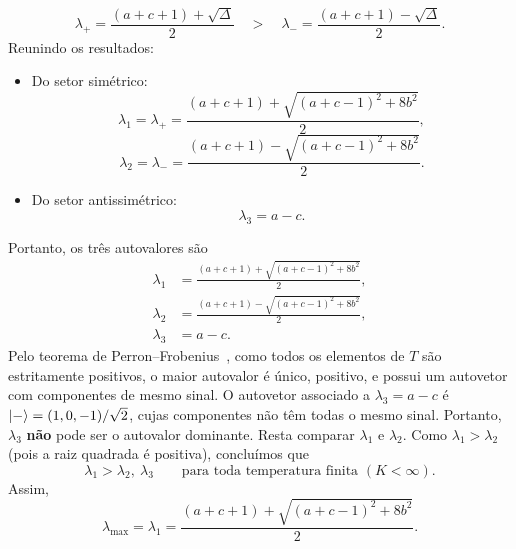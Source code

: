 \documentclass[11pt,a4paper]{article}
\begin{document}
%
\begin{equation}
    \lambda_+ = \frac{(a + c + 1) + \sqrt{\Delta}}{2}
    \quad > \quad
    \lambda_- = \frac{(a + c + 1) - \sqrt{\Delta}}{2}.
\end{equation}
%
Reunindo os resultados:
%
\begin{itemize}
    \item Do setor simétrico:
    \begin{equation}
        \lambda_1 = \lambda_+ = \frac{(a + c + 1) + \sqrt{(a + c - 1)^2 + 8b^2}}{2},
    \end{equation}
    \begin{equation}
        \lambda_2 = \lambda_- = \frac{(a + c + 1) - \sqrt{(a + c - 1)^2 + 8b^2}}{2}.
    \end{equation}

    \item Do setor antissimétrico:
    \begin{equation}
        \lambda_3 = a - c.
    \end{equation}
\end{itemize}
%
Portanto, os três autovalores são
%
\begin{equation}
    \boxed{
    \begin{aligned}
        \lambda_1 &= \frac{(a + c + 1) + \sqrt{(a + c - 1)^2 + 8b^2}}{2}, \\[6pt]
        \lambda_2 &= \frac{(a + c + 1) - \sqrt{(a + c - 1)^2 + 8b^2}}{2}, \\[6pt]
        \lambda_3 &= a - c.
    \end{aligned}
    }
    \label{eq:autovalores_completos}
\end{equation}
%
Pelo teorema de Perron–Frobenius~\cite{MacCluer2000}, como todos os elementos de \(T\) são estritamente positivos, o maior autovalor é único, positivo, e possui um autovetor com componentes de mesmo sinal. O autovetor associado a \(\lambda_3 = a - c\) é \(\ket{-} = (1,0,-1)/\sqrt{2}\), cujas componentes não têm todas o mesmo sinal. Portanto, \(\lambda_3\) \textbf{não} pode ser o autovalor dominante. Resta comparar \(\lambda_1\) e \(\lambda_2\). Como \(\lambda_1 > \lambda_2\) (pois a raiz quadrada é positiva), concluímos que
%
\begin{equation}
    \boxed{
    \lambda_1 > \lambda_2,\ \lambda_3
    \qquad \text{para toda temperatura finita } (K < \infty).
    }
\end{equation}
%
Assim,
%
\begin{equation}
    \lambda_{\max} = \lambda_1 = \frac{(a + c + 1) + \sqrt{(a + c - 1)^2 + 8b^2}}{2}.
\end{equation}
%
\end{document}
